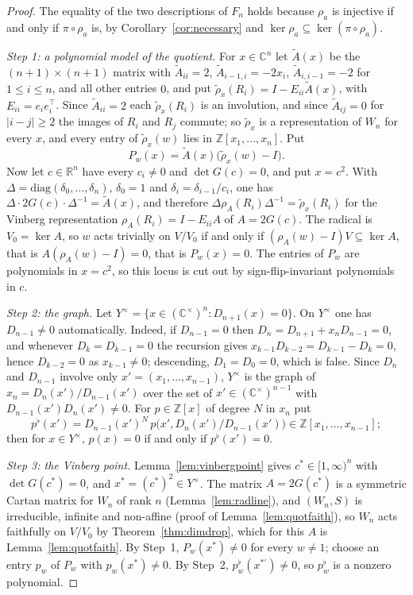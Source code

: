 \documentclass[11pt]{article}
\theoremstyle{definition}
\theoremstyle{remark}
\theoremstyle{definition}
\newcommand{\Z}{\mathbb{Z}}
\newcommand{\R}{\mathbb{R}}
\newcommand{\C}{\mathbb{C}}
\begin{document}
\begin{proof}
The equality of the two descriptions of $F_n$ holds because $\rho_a$ is injective if and only if
$\pi\circ\rho_a$ is, by Corollary~\ref{cor:necessary} and $\ker\rho_a\subseteq\ker(\pi\circ\rho_a)$.

\emph{Step 1: a polynomial model of the quotient.} For $x\in\C^n$ let $\widetilde A(x)$ be the
$(n+1)\times(n+1)$ matrix with $\widetilde A_{ii}=2$, $\widetilde A_{i-1,i}=-2x_i$,
$\widetilde A_{i,i-1}=-2$ for $1\le i\le n$, and all other entries $0$, and put
$\widetilde\rho_x(R_i)=I-E_{ii}\widetilde A(x)$, with $E_{ii}=e_ie_i^{\!\top}$. Since
$\widetilde A_{ii}=2$ each $\widetilde\rho_x(R_i)$ is an involution, and since
$\widetilde A_{ij}=0$ for $|i-j|\ge2$ the images of $R_i$ and $R_j$ commute; so $\widetilde\rho_x$
is a representation of $W_n$ for every $x$, and every entry of $\widetilde\rho_x(w)$ lies in
$\Z[x_1,\dots,x_n]$. Put
\[
  P_w(x)=\widetilde A(x)\bigl(\widetilde\rho_x(w)-I\bigr).
\]
Now let $c\in\R^n$ have every $c_i\ne0$ and $\det G(c)=0$, and put $x=c^2$. With
$\Delta=\mathrm{diag}(\delta_0,\dots,\delta_n)$, $\delta_0=1$ and $\delta_i=\delta_{i-1}/c_i$, one
has $\Delta\cdot2G(c)\cdot\Delta^{-1}=\widetilde A(x)$, and therefore
$\Delta\rho_A(R_i)\Delta^{-1}=\widetilde\rho_x(R_i)$ for the Vinberg representation
$\rho_A(R_i)=I-E_{ii}A$ of $A=2G(c)$. The radical is $V_0=\ker A$, so $w$ acts trivially on
$V/V_0$ if and only if $(\rho_A(w)-I)V\subseteq\ker A$, that is $A(\rho_A(w)-I)=0$, that is
$P_w(x)=0$. The entries of $P_w$ are polynomials in $x=c^2$, so this locus is cut out by
sign-flip-invariant polynomials in $c$.

\emph{Step 2: the graph.} Let $Y^\times=\{x\in(\C^\times)^n:D_{n+1}(x)=0\}$. On $Y^\times$ one has
$D_{n-1}\ne0$ automatically. Indeed, if $D_{n-1}=0$ then $D_n=D_{n+1}+x_nD_{n-1}=0$, and whenever
$D_k=D_{k-1}=0$ the recursion gives $x_{k-1}D_{k-2}=D_{k-1}-D_k=0$, hence $D_{k-2}=0$ as
$x_{k-1}\ne0$; descending, $D_1=D_0=0$, which is false. Since $D_n$ and $D_{n-1}$ involve only
$x'=(x_1,\dots,x_{n-1})$, $Y^\times$ is the graph of $x_n=D_n(x')/D_{n-1}(x')$ over the set of
$x'\in(\C^\times)^{n-1}$ with $D_{n-1}(x')D_n(x')\ne0$. For $p\in\Z[x]$ of degree $N$ in $x_n$ put
\[
  p^\flat(x')=D_{n-1}(x')^N\,p\bigl(x',D_n(x')/D_{n-1}(x')\bigr)\in\Z[x_1,\dots,x_{n-1}] ;
\]
then for $x\in Y^\times$, $p(x)=0$ if and only if $p^\flat(x')=0$.

\emph{Step 3: the Vinberg point.} Lemma~\ref{lem:vinbergpoint} gives $c^\ast\in[1,\infty)^n$ with
$\det G(c^\ast)=0$, and $x^\ast=(c^\ast)^2\in Y^\times$. The matrix $A=2G(c^\ast)$ is a symmetric
Cartan matrix for $W_n$ of rank $n$ (Lemma~\ref{lem:radline}), and $(W_n,S)$ is irreducible,
infinite and non-affine (proof of Lemma~\ref{lem:quotfaith}), so $W_n$ acts faithfully on
$V/V_0$ by Theorem~\ref{thm:dimdrop}, which for this $A$ is Lemma~\ref{lem:quotfaith}. By Step~1, $P_w(x^\ast)\ne0$ for
every $w\ne1$; choose an entry $p_w$ of $P_w$ with $p_w(x^\ast)\ne0$. By Step~2,
$p_w^\flat(x^{\ast\prime})\ne0$, so $p_w^\flat$ is a nonzero polynomial.


\end{proof}
\end{document}
